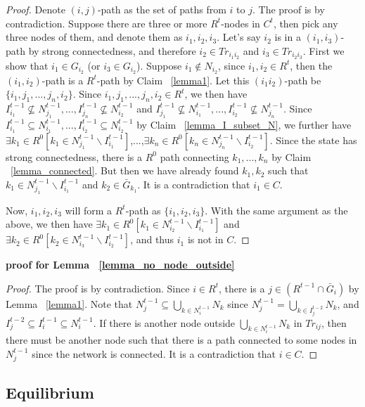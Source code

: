 \documentclass[12pt,letter]{article}
\theoremstyle{definition}
\theoremstyle{remark}
\theoremstyle{claim}
\begin{document}
\begin{proof}
Denote $(i,j)$-path as the set of paths from $i$ to $j$. The proof is by contradiction. Suppose there are three or more $R^t$-nodes in $C^t$, then pick any three nodes of them, and denote them as $i_1,i_2,i_3$. Let's say $i_2$ is in a $(i_1,i_3)$-path by strong connectedness, and therefore $i_2\in Tr_{i_1i_2}$ and $i_3\in Tr_{i_2i_3}$. First we show that $i_1\in G_{i_2}$ (or $i_3\in G_{i_2}$). Suppose $i_1\notin N_{i_2}$, since $i_1,i_2\in R^t$, then the $(i_1,i_2)$-path is a $R^t$-path by Claim ~\ref{lemma1}. Let this $(i_1i_2)$-path be $\{i_1,j_1,...,j_n,i_2\}$. Since $i_1,j_1,...,j_n,i_2\in R^t$, we then have $I^{t-1}_{i_1}\nsubseteq N^{t-1}_{j_1},...,I^{t-1}_{j_n}\nsubseteq N^{t-1}_{i_2}$ and $I^{t-1}_{j_1}\nsubseteq N^{t-1}_{i_1},...,I^{t-1}_{i_2}\nsubseteq N^{t-1}_{j_n}$. Since $I^{t-1}_{i_1}\subseteq N^{t-1}_{i_1},...,I^{t-1}_{i_2}\subseteq N^{t-1}_{i_2}$ by Claim ~\ref{lemma_I_subset_N}, we further have $\exists k_1\in R^0[k_1\in N^{t-1}_{j_1}\backslash I^{t-1}_{i_1}]$,...,$\exists k_n\in R^0[k_n\in N^{t-1}_{j_n}\backslash I^{t-1}_{i_2}]$. Since the state has strong connectedness, there is a $R^0$ path connecting $k_1,...,k_n$ by Claim ~\ref{lemma_connected}. But then we have already found $k_1,k_2$ such that $k_1\in N^{t-1}_{j_1}\backslash I^{t-1}_{i_1}$ and $k_2\in \bar{G}_{k_1}$. It is a contradiction that $i_1\in C$.

Now, $i_1,i_2,i_3$ will form a $R^t$-path as $\{i_1,i_2,i_3\}$. With the same argument as the above, we then have $\exists k_1\in R^0[k_1\in N^{t-1}_{i_2}\backslash I^{t-1}_{i_1}]$ and $\exists k_2\in R^0[k_2\in N^{t-1}_{i_3}\backslash I^{t-1}_{i_2}]$, and thus $i_1$ is not in $C$.
\end{proof}


\noindent\textbf{proof for Lemma ~\ref{lemma_no_node_outside}}
\begin{proof}
The proof is by contradiction. Since $i\in R^t$, there is a $j\in (R^{t-1}\cap \bar{G}_i)$ by Lemma ~\ref{lemma1}. Note that $N^{t-1}_j\subseteq \bigcup_{k\in N^{t-1}_i}N_k$ since $N^{t-1}_j =\bigcup_{k\in I^{t-2}_j}N_k$, and $I^{t-2}_j\subseteq I^{t-1}_i\subseteq N^{t-1}_i$. If there is another node outside $\bigcup_{k\in N^{t-1}_i}N_k$ in $Tr_{ij}$, then there must be another node such that there is a path connected to some nodes in $N^{t-1}_j$ since the network is connected. It is a contradiction that $i\in C$.

\end{proof}

\subsection{Equilibrium}
\label{Apn_equilibrium}
\end{document}
